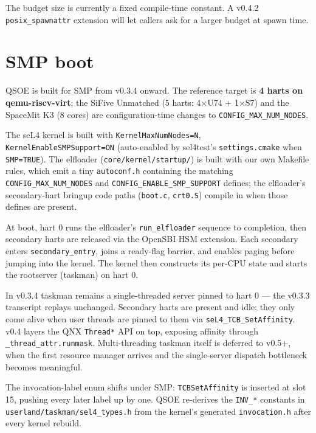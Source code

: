 The budget size is currently a fixed compile-time constant.  A v0.4.2
\texttt{posix\_spawnattr} extension will let callers ask for a larger
budget at spawn time.

\section{SMP boot}
\label{sec:smp-boot}

QSOE is built for SMP from v0.3.4 onward.  The reference target is
\textbf{4 harts on qemu-riscv-virt}; the SiFive Unmatched (5 harts:
4$\times$U74 + 1$\times$S7) and the SpaceMit K3 (8 cores) are
configuration-time changes to \texttt{CONFIG\_MAX\_NUM\_NODES}.

The seL4 kernel is built with \texttt{KernelMaxNumNodes=N},
\texttt{KernelEnableSMPSupport=ON} (auto-enabled by sel4test's
\texttt{settings.cmake} when \texttt{SMP=TRUE}).  The elfloader
(\texttt{core/kernel/startup/}) is built with our own Makefile rules,
which emit a tiny \texttt{autoconf.h} containing the matching
\texttt{CONFIG\_MAX\_NUM\_NODES} and \texttt{CONFIG\_ENABLE\_SMP\_SUPPORT}
defines; the elfloader's secondary-hart bringup code paths
(\texttt{boot.c}, \texttt{crt0.S}) compile in when those defines are
present.

At boot, hart 0 runs the elfloader's \texttt{run\_elfloader} sequence
to completion, then secondary harts are released via the OpenSBI HSM
extension.  Each secondary enters \texttt{secondary\_entry}, joins a
ready-flag barrier, and enables paging before jumping into the kernel.
The kernel then constructs its per-CPU state and starts the rootserver
(taskman) on hart 0.

In v0.3.4 taskman remains a single-threaded server pinned to hart 0
--- the v0.3.3 transcript replays unchanged.  Secondary harts are
present and idle; they only come alive when user threads are pinned
to them via \texttt{seL4\_TCB\_SetAffinity}.  v0.4 layers the QNX
\texttt{Thread*} API on top, exposing affinity through
\texttt{\_thread\_attr.runmask}.  Multi-threading taskman itself is
deferred to v0.5+, when the first resource manager arrives and the
single-server dispatch bottleneck becomes meaningful.

The invocation-label enum shifts under SMP: \texttt{TCBSetAffinity}
is inserted at slot 15, pushing every later label up by one.
QSOE re-derives the \texttt{INV\_*} constants in
\texttt{userland/taskman/sel4\_types.h} from the kernel's generated
\texttt{invocation.h} after every kernel rebuild.

